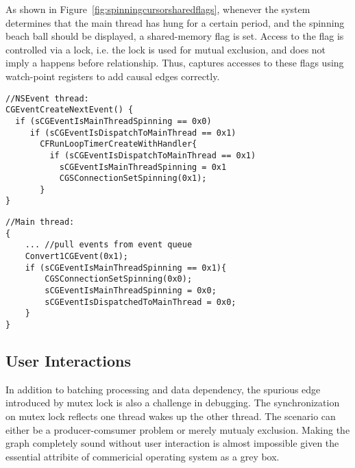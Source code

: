 As shown in Figure~\ref{fig:spinningcursorsharedflags},
whenever the system determines that the main thread has hung for a certain
period, and the spinning beach ball should be displayed, a shared-memory flag
is set. Access to the flag is controlled via a lock, i.e. the lock is used for
mutual exclusion, and does not imply a happens before relationship. Thus, \xxx
captures accesses to these flags using watch-point registers to add causal edges
correctly.

\begin{figure*}[ht!]
\begin{minipage}[t]{0.5\textwidth}
\begin{lstlisting}
//NSEvent thread:
CGEventCreateNextEvent() {
  if (sCGEventIsMainThreadSpinning == 0x0)
     if (sCGEventIsDispatchToMainThread == 0x1)
       CFRunLoopTimerCreateWithHandler{
         if (sCGEventIsDispatchToMainThread == 0x1)
           sCGEventIsMainThreadSpinning = 0x1
           CGSConnectionSetSpinning(0x1);
       }
}
\end{lstlisting}
\end{minipage}
\begin{minipage}[t]{0.4\textwidth}
\begin{lstlisting}
//Main thread:
{
	... //pull events from event queue
	Convert1CGEvent(0x1);
	if (sCGEventIsMainThreadSpinning == 0x1){
  		CGSConnectionSetSpinning(0x0);
  		sCGEventIsMainThreadSpinning = 0x0;
  		sCGEventIsDispatchedToMainThread = 0x0;
	}
}
\end{lstlisting}
\end{minipage}
    \caption{Spinning Cursor Shared Flags}
    \label{fig:spinningcursorsharedflags}
\end{figure*}

\subsection{User Interactions}\label{subsec:userinteraction}

In addition to batching processing and data dependency, the spurious edge
introduced by mutex lock is also a challenge in debugging. The synchronization
on mutex lock reflects one thread wakes up the other thread. The scenario can
either be a producer-comsumer problem or merely mutualy exclusion. Making the
graph completely sound without user interaction is almost impossible given the
essential attribite of commericial operating system as a grey box.

